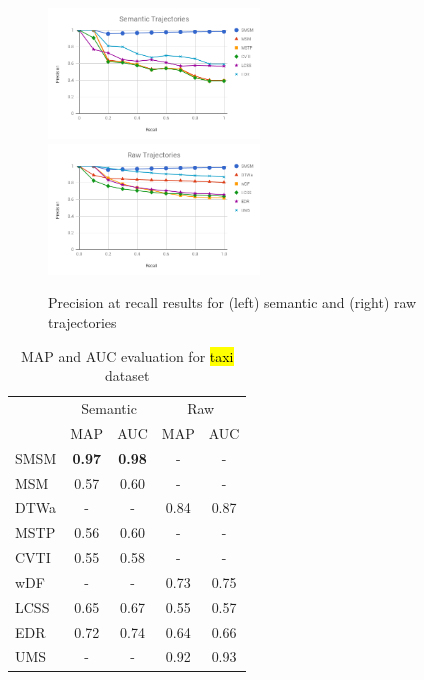 \documentclass[12pt]{article}
\begin{document}
\begin{figure}[ht!]
\centering
\centerline{
\includegraphics[width=0.5\textwidth]{Images/P_R-chart_San_Francisco.png}
\includegraphics[width=0.5\textwidth]{Images/P_R-chart_San_Francisco-raw.png}
}
\caption{Precision at recall results for (left) semantic and (right) raw trajectories}
\label{fig:sanfrancisco_precision_recall}
\end{figure}

\begin{table}[h]
\scriptsize
  \centering
  \begin{tabular}{|l|c|c|c|c|}
  	\hline
 & \multicolumn{2}{c}{Semantic} & \multicolumn{2}{|c|}{Raw} \\
 	\cline{2-5}
 & MAP & AUC & MAP & AUC \\
  	\hline
SMSM & \textbf{0.97} & \textbf{0.98} & - & -\\
MSM & 0.57 & 0.60 & - & -\\
DTWa & - & - & 0.84 & 0.87\\
MSTP & 0.56 & 0.60 & - & -\\
CVTI & 0.55 & 0.58 & - & -\\
 wDF & - & - & 0.73 & 0.75\\
LCSS & 0.65 & 0.67 & 0.55 & 0.57\\
 EDR & 0.72 & 0.74 & 0.64 & 0.66\\
UMS & - & - & 0.92 & 0.93 \\
    \hline
  \end{tabular}
  \caption{MAP and AUC evaluation for \hl{taxi} dataset}
  \label{tab:sanfrancisco_measures_map_auc}
\end{table}
\end{document}
